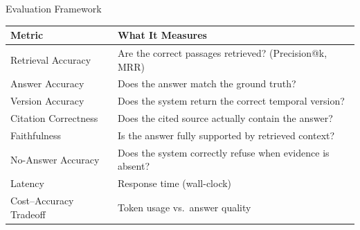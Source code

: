 \documentclass[11pt]{beamer}
\begin{document}
\begin{frame}{Evaluation Framework}
    \begin{table}[h]
    \centering
    \small
    \begin{tabular}{@{}p{3.2cm}p{6.5cm}@{}}
        \toprule
        \textbf{Metric} & \textbf{What It Measures}\\
        \midrule
        Retrieval Accuracy & Are the correct passages retrieved? (Precision@k, MRR)\\[3pt]
        Answer Accuracy & Does the answer match the ground truth?\\[3pt]
        Version Accuracy & Does the system return the correct temporal version?\\[3pt]
        Citation Correctness & Does the cited source actually contain the answer?\\[3pt]
        Faithfulness & Is the answer fully supported by retrieved context?\\[3pt]
        No-Answer Accuracy & Does the system correctly refuse when evidence is absent?\\[3pt]
        Latency & Response time (wall-clock)\\[3pt]
        Cost--Accuracy Tradeoff & Token usage vs.\ answer quality\\
        \bottomrule
    \end{tabular}
    \end{table}
\end{frame}

\end{document}
